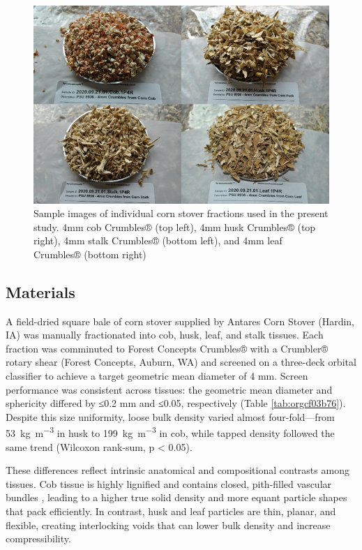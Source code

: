 \documentclass[xcolor=dvipsnames,10pt,hidelinks]{article}
\let\oldsubsection\subsection
\renewcommand{\subsection}{\clearpage\oldsubsection}
\begin{document}
\begin{figure}[htbp]
\centering
\includegraphics[width=.9\linewidth]{figures/image2.png}
\caption{\label{fig:org754a5e8}Sample images of individual corn stover fractions used in the present study. 4mm cob Crumbles® (top left), 4mm husk Crumbles® (top right), 4mm stalk Crumbles® (bottom left), and 4mm leaf Crumbles® (bottom right)}
\end{figure}
\subsection{Materials}
\label{sec:org0b62039}
A field-dried square bale of corn stover supplied by Antares Corn Stover (Hardin, IA) was manually fractionated into cob, husk, leaf, and stalk tissues.
Each fraction was comminuted to Forest Concepts Crumbles® with a Crumbler® rotary shear (Forest Concepts, Auburn, WA) and
screened on a three-deck orbital classifier to achieve a target geometric mean diameter of 4 mm.
Screen performance was consistent across tissues:
the geometric mean diameter and sphericity differed by ≤0.2 mm and ≤0.05, respectively (Table \ref{tab:orgcf03b76}).
Despite this size uniformity, loose bulk density varied almost four-fold—from \qty{53}{\kilo\gram\per\cubic\meter} in husk
to \qty{199}{\kilo\gram\per\cubic\meter} in cob, while tapped density followed the same trend (Wilcoxon rank-sum, p < 0.05).

These differences reflect intrinsic anatomical and compositional contrasts among tissues.
Cob tissue is highly lignified \parencite{berchem_corn_2017} and contains closed, pith-filled vascular bundles \parencite{thornburg_mass_2022},
leading to a higher true solid density and more equant particle shapes that pack efficiently.
In contrast, husk and leaf particles are thin, planar, and flexible, creating interlocking voids \parencite{thornburg_mass_2022,li_characterization_2020} that
can lower bulk density and increase compressibility.
\end{document}

